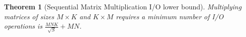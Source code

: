 \documentclass[sigplan,review,anonymous]{acmart}\settopmatter{printfolios=true,printccs=false,printacmref=false}
\newcommand\mac[1]{\textcolor{red}{[Mac: #1]}}
\newtheorem{thm}{Theorem}
\begin{document}
%
%
\begin{thm}[Sequential Matrix Multiplication I/O lower bound] 
Multiplying matrices of sizes $M \times K$ and $K \times M $ requires a minimum 
number of I/O operations is $\frac{MNK}{\sqrt{S}} + MN$.
  \label{thm:seqlowbounds}
\end{thm}
\end{document}
